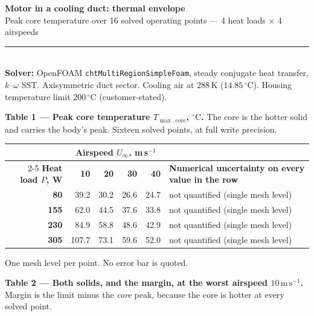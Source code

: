 \documentclass[9pt,a4paper]{article}
\renewcommand{\footnotesize}{\fontsize{6.9}{7.9}\selectfont}
\begin{document}
\fontsize{8}{9.0}\selectfont
\enlargethispage{30pt}

{\fontsize{14}{16}\selectfont\bfseries Motor in a cooling duct: thermal envelope}\\[1.5pt]
{\fontsize{8.8}{10}\selectfont Peak core temperature over 16 solved operating
points --- 4 heat loads $\times$ 4 airspeeds}\\[2pt]
{\color{rulegrey}\rule{\textwidth}{0.9pt}}\\[1pt]
{\footnotesize\textbf{Solver:} OpenFOAM \texttt{chtMultiRegionSimpleFoam},
steady conjugate heat transfer, $k$--$\omega$ SST.
Axisymmetric duct sector. Cooling air at $288\,\mathrm{K}$
($14.85\,^{\circ}\mathrm{C}$). Housing temperature limit
$200\,^{\circ}\mathrm{C}$ (customer-stated).}

\vspace{2pt}
\textbf{Table 1 --- Peak core temperature
$T_{\max,\mathrm{core}}$, $^{\circ}\mathrm{C}$.} The core is the hotter solid
and carries the body's peak. Sixteen solved points, at full write precision.

\vspace{2pt}
\begin{tabular}{r rrrr l}
\toprule
 & \multicolumn{4}{c}{\textbf{Airspeed $U_{\infty}$, m\,s$^{-1}$}} & \\
\cmidrule(lr){2-5}
\textbf{Heat load $P$, W} & \textbf{10} & \textbf{20} & \textbf{30} & \textbf{40}
 & \textbf{Numerical uncertainty on every value in the row} \\
\midrule
\textbf{80} & 39.2 & 30.2 & 26.6 & 24.7 & not quantified (single mesh level) \\
\textbf{155} & 62.0 & 44.5 & 37.6 & 33.8 & not quantified (single mesh level) \\
\textbf{230} & 84.9 & 58.8 & 48.6 & 42.9 & not quantified (single mesh level) \\
\textbf{305} & 107.7 & 73.1 & 59.6 & 52.0 & not quantified (single mesh level) \\
\bottomrule
\end{tabular}

\vspace{1.5pt}
{\footnotesize One mesh level per point. No error bar is quoted.}

\vspace{2pt}
\textbf{Table 2 --- Both solids, and the margin, at the worst airspeed
$10\,\mathrm{m\,s^{-1}}$.} Margin is the limit minus the \emph{core} peak,
because the core is hotter at every solved point.
\end{document}
